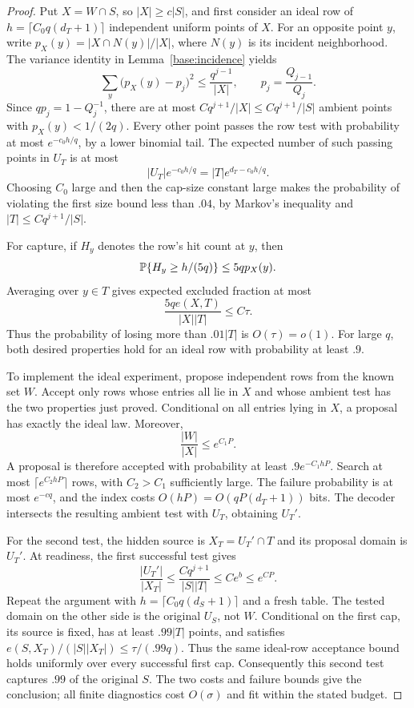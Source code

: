 \begin{proof}
Put $X=W\cap S$, so $|X|\geq c|S|$, and first consider an ideal row
of $h=\lceil C_0q(d_T+1)\rceil$ independent uniform points of $X$.
For an opposite point $y$, write
$p_X(y)=|X\cap N(y)|/|X|$, where $N(y)$ is its incident neighborhood.
The variance identity in Lemma~\ref{base:incidence} yields
\[
 \sum_y\bigl(p_X(y)-p_j\bigr)^2
 \leq \frac{q^{j-1}}{|X|},
 \qquad p_j=\frac{Q_{j-1}}{Q_j}.
\]
Since $qp_j=1-Q_j^{-1}$, there are at most
$Cq^{j+1}/|X|\leq Cq^{j+1}/|S|$ ambient points with
$p_X(y)<1/(2q)$. Every other point passes the row test with probability
at most $e^{-c_0h/q}$, by a lower binomial tail. The expected number of
such passing points in $U_T$ is at most
\[
 |U_T|e^{-c_0h/q}
 =|T|e^{d_T-c_0h/q}.
\]
Choosing $C_0$ large and then the cap-size constant large makes the
probability of violating the first size bound less than $.04$, by
Markov's inequality and $|T|\leq Cq^{j+1}/|S|$.

For capture, if $H_y$ denotes the row's hit count at $y$, then
\begin{equation}\label{geom:pointwise-iid}
 \mathbb P\{H_y\geq h/(5q)\}
 \leq 5q p_X(y).
\end{equation}
Averaging over $y\in T$ gives expected excluded fraction at most
\[
 \frac{5q e(X,T)}{|X||T|}
 \leq C\tau.
\]
Thus the probability of losing more than $.01|T|$ is $O(\tau)=o(1)$.
For large $q$, both desired properties hold for an ideal row with
probability at least $.9$.

To implement the ideal experiment, propose independent rows from the
known set $W$. Accept only rows whose entries all lie in $X$ and whose
ambient test has the two properties just proved. Conditional on all
entries lying in $X$, a proposal has exactly the ideal law. Moreover,
\[
 \frac{|W|}{|X|}\leq e^{C_1P}.
\]
A proposal is therefore accepted with probability at least
$.9e^{-C_1hP}$. Search at most
$\lceil e^{C_2hP}\rceil$ rows, with $C_2>C_1$ sufficiently large.
The failure probability is at most $e^{-cq}$, and the index costs
$O(hP)=O(qP(d_T+1))$ bits. The decoder intersects the resulting ambient
test with $U_T$, obtaining $U_T'$.

For the second test, the hidden source is $X_T=U_T'\cap T$ and its
proposal domain is $U_T'$. At readiness, the first successful test gives
\[
 \frac{|U_T'|}{|X_T|}
 \leq \frac{Cq^{j+1}}{|S||T|}
 \leq Ce^b\leq e^{CP}.
\]
Repeat the argument with $h=\lceil C_0q(d_S+1)\rceil$ and a fresh
table. The tested domain on the other side is the original $U_S$, not
$W$. Conditional on the first cap, its source is fixed, has at least
$.99|T|$ points, and satisfies
$e(S,X_T)/(|S||X_T|)\leq\tau/(.99q)$. Thus the same ideal-row
acceptance bound holds uniformly over every successful first cap.
Consequently this second test captures $.99$ of the original $S$.
The two costs and failure bounds give the conclusion; all finite
diagnostics cost $O(\sigma)$ and fit within the stated budget.
\end{proof}

